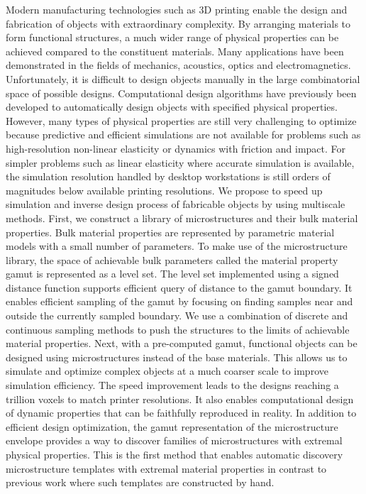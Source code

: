% 
% 
%
Modern manufacturing technologies such as 3D printing enable the design and fabrication of objects with extraordinary complexity.
By arranging materials to form functional structures, a much wider range of physical properties can be achieved compared to the constituent materials.
Many applications have been demonstrated in the fields of mechanics, acoustics, optics and electromagnetics.
Unfortunately, it is difficult to design objects manually in the large combinatorial space of possible designs.
Computational design algorithms have previously been developed to automatically design objects with specified physical properties.
However, many types of physical properties are still very challenging to optimize because predictive and efficient simulations are not available for 
problems such as high-resolution non-linear elasticity or dynamics with friction and impact.
For simpler problems such as linear elasticity where accurate simulation is available,
the simulation resolution handled by desktop workstations is still orders of magnitudes below available printing resolutions.
We propose to speed up simulation and inverse design process of fabricable objects by using multiscale methods.
First, we construct a library of microstructures and their bulk material properties.
Bulk material properties are represented by parametric material models with a small number of parameters.
To make use of the microstructure library, the space of achievable bulk parameters called the material property gamut is represented as a level set.
The level set implemented using a signed distance function supports efficient query of distance to the gamut boundary. It enables efficient sampling of the gamut by focusing on finding samples near and outside the currently sampled boundary. We use a combination of discrete and continuous sampling methods to push the structures to the limits of achievable material properties.
Next, with a pre-computed gamut, functional objects can be designed using microstructures instead of the base materials.
This allows us to simulate and optimize complex objects at a much coarser scale to improve simulation efficiency. The speed improvement leads to the designs reaching a trillion voxels to match printer resolutions. It also enables computational design of dynamic properties that can be faithfully reproduced in reality.
In addition to efficient design optimization, 
the gamut representation of the microstructure envelope provides a way to discover families of microstructures with extremal physical properties.
This is the first method that enables automatic discovery microstructure templates with extremal material properties in contrast to previous work where such templates are constructed by hand.
